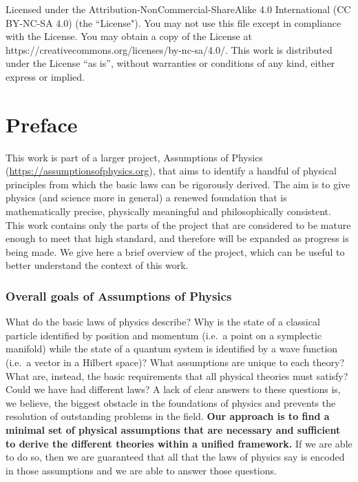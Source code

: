 \documentclass[11pt,letterpaper,fleqn]{memoir} %
\begin{document}
\vspace{12pt}

\noindent Licensed under the Attribution-NonCommercial-ShareAlike 4.0 International (CC BY-NC-SA 4.0) (the ``License"). You may not use this file except in compliance with the License. You may obtain a copy of the License at https://creativecommons.org/licenses/by-nc-sa/4.0/. This work is distributed under the License ``as is'', without warranties or conditions of any kind, either express or implied.

\chapter{Preface}

This work is part of a larger project, Assumptions of Physics (\url{https://assumptionsofphysics.org}), that aims to identify a handful of physical principles from which the basic laws can be rigorously derived. The aim is to give physics (and science more in general) a renewed foundation that is mathematically precise, physically meaningful and philosophically consistent. This work contains only the parts of the project that are considered to be mature enough to meet that high standard, and therefore will be expanded as progress is being made. We give here a brief overview of the project, which can be useful to better understand the context of this work.

\subsection{Overall goals of Assumptions of Physics}

What do the basic laws of physics describe? Why is the state of a classical particle identified by position and momentum (i.e.~a point on a symplectic manifold) while the state of a quantum system is identified by a wave function (i.e.~a vector in a Hilbert space)? What assumptions are unique to each theory? What are, instead, the basic requirements that all physical theories must satisfy? Could we have had different laws? A lack of clear answers to these questions is, we believe, the biggest obstacle in the foundations of physics and prevents the resolution of outstanding problems in the field. \textbf{Our approach is to find a minimal set of physical assumptions that are necessary and sufficient to derive the different theories within a unified framework.} If we are able to do so, then we are guaranteed that all that the laws of physics say is encoded in those assumptions and we are able to answer those questions.
\end{document}
